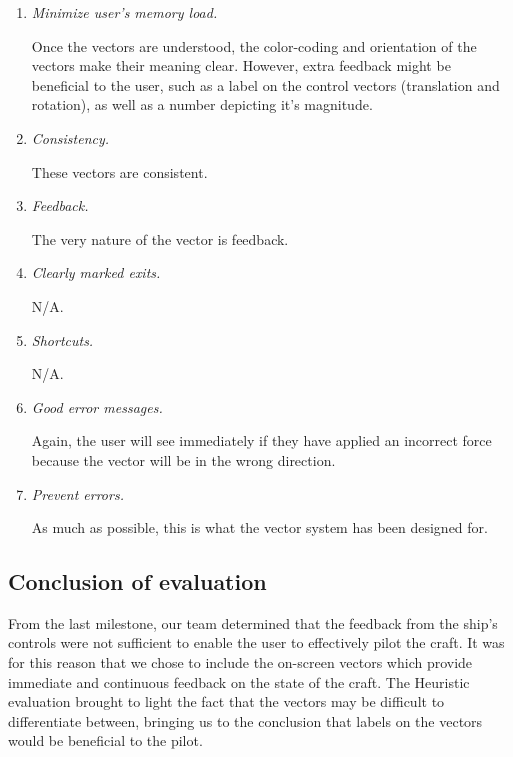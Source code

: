 \begin{enumerate}
\begin{enumerate}
  \item \emph{Minimize user's memory load.}

  Once the vectors are understood, the color-coding and orientation of the vectors make their meaning clear.  However, extra feedback might be beneficial to the user, such as a label on the control vectors (translation and rotation), as well as a number depicting it's magnitude.
  
  \item \emph{Consistency.}

  These vectors are consistent.
  
  \item \emph{Feedback.}

  The very nature of the vector is feedback.
  
  \item \emph{Clearly marked exits.}

  N/A.
  
  \item \emph{Shortcuts.}

  N/A.
  
  \item \emph{Good error messages.}
  
  Again, the user will see immediately if they have applied an incorrect force because the vector will be in the wrong direction.

  \item \emph{Prevent errors.}

  As much as possible, this is what the vector system has been designed for.
 
\end{enumerate}

\end{enumerate}

\subsection*{Conclusion of evaluation}

From the last milestone, our team determined that the feedback from the ship's controls were not sufficient to enable the user to effectively pilot the craft.  It was for this reason that we chose to include the on-screen vectors which provide immediate and continuous feedback on the state of the craft.  The Heuristic evaluation brought to light the fact that the vectors may be difficult to differentiate between, bringing us to the conclusion that labels on the vectors would be beneficial to the pilot.  

